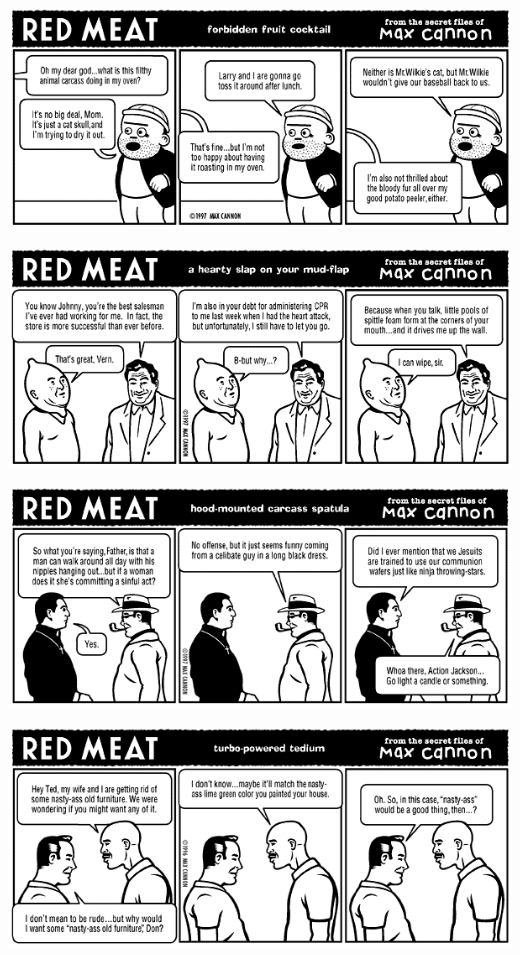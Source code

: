 \documentclass[a4paper,twoside,11pt]{article}
\begin{document}
\includegraphics[width=\textwidth]{redmeat_1997-01-20.png}



\includegraphics[width=\textwidth]{redmeat_1997-01-27.png}



\includegraphics[width=\textwidth]{redmeat_1997-02-03.png}



\includegraphics[width=\textwidth]{redmeat_1997-02-10.png}
\end{document}
